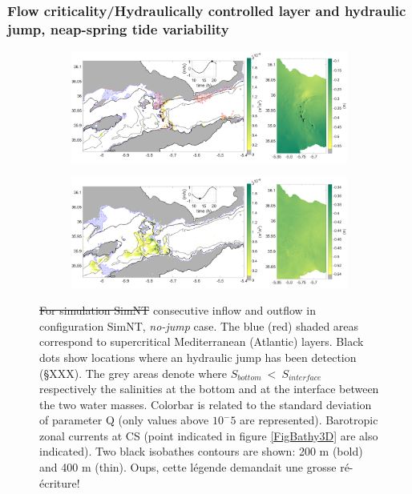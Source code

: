 \subsubsection{Flow criticality/Hydraulically controlled layer and hydraulic jump, neap-spring tide variability}
\label{section3DResFlow}

\begin{figure}[!h]
 \centering
 
 \begin{subfigure}{\linewidth}
\centering
\includegraphics[width=1\linewidth]{./GBR3D/ME2_19h_p.png}
\end{subfigure}
 
 \begin{subfigure}{\linewidth}
\centering
\includegraphics[width=\linewidth]{./GBR3D/ME2_13h_p.png}
\end{subfigure}
\caption { \color{blue} \sout{For simulation SimNT} consecutive inflow and outflow in configuration SimNT, \textit{no-jump} case. The blue (red) shaded areas correspond to supercritical Mediterranean (Atlantic) layers. Black dots show locations where an hydraulic jump has been detection (\S XXX). The grey areas denote where $S_{bottom}\ <\ S_{interface}$ respectively the salinities at the bottom and at the interface between the two water masses. Colorbar is related to the standard deviation of parameter Q (only values above $10^-5$ are represented). Barotropic zonal currents at CS (point indicated in figure \ref{FigBathy3D} are also indicated). Two black isobathes contours are shown: 200 m (bold) and 400 m (thin). \color{green} Oups, cette légende demandait une grosse ré-écriture! \color{black}}

\label{FigHCN}
\end{figure}

